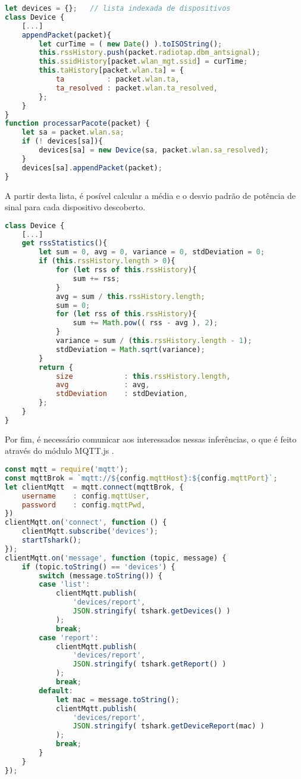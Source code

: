 \begin{lstlisting}[language=javascript,caption={Adição do pacote ao histórico do dispositivo},label=code-device-packet]
let devices = {};	// lista indexada de dispositivos
class Device {
	[...]
	appendPacket(packet){
		let curTime = ( new Date() ).toISOString();
		this.rssHistory.push(packet.radiotap.dbm_antsignal);
		this.ssidHistory[packet.wlan_mgt.ssid] = curTime;
		this.taHistory[packet.wlan.ta] = {
			ta			: packet.wlan.ta,
			ta_resolved	: packet.wlan.ta_resolved,
		};
	}
}
function processarPacote(packet) {
	let sa = packet.wlan.sa;
	if (! devices[sa]){
		devices[sa] = new Device(sa, packet.wlan.sa_resolved);
	}
	devices[sa].appendPacket(packet);
}
\end{lstlisting}

A partir desta lista, é posível calcular a média e o desvio padrão de potência de
sinal para cada dispositivo descoberto.

\begin{lstlisting}[language=javascript,caption={Extração das estatísticas do dispositivo},label=code-device-stats]
class Device {
	[...]
	get rssStatistics(){
		let sum = 0, avg = 0, variance = 0, stdDeviation = 0;
		if (this.rssHistory.length > 0){
			for (let rss of this.rssHistory){
				sum += rss;
			}
			avg = sum / this.rssHistory.length;
			sum = 0;
			for (let rss of this.rssHistory){
				sum += Math.pow(( rss - avg ), 2);
			}
			variance = sum / (this.rssHistory.length - 1);
			stdDeviation = Math.sqrt(variance);
		}
		return {
			size			: this.rssHistory.length,
			avg				: avg,
			stdDeviation	: stdDeviation,
		};
	}
}
\end{lstlisting}


Por fim, é necessário comunicar aos interessados nessas inferências, o que é
feito através do módulo MQTT.js \cite{mqttjs}.

\begin{lstlisting}[language=javascript,caption={Cliente MQTT.js},label=code-mqttjs-client]
const mqtt = require('mqtt');
const mqttBrok = `mqtt://${config.mqttHost}:${config.mqttPort}`;
let clientMqtt	= mqtt.connect(mqttBrok, {
	username	: config.mqttUser,
	password	: config.mqttPwd,
})
clientMqtt.on('connect', function () {
	clientMqtt.subscribe('devices');
	startTshark();
});
clientMqtt.on('message', function (topic, message) {
	if (topic.toString() == 'devices') {
		switch (message.toString()) {
		case 'list':
			clientMqtt.publish(
				'devices/report',
				JSON.stringify( tshark.getDevices() )
			);
			break;
		case 'report':
			clientMqtt.publish(
				'devices/report',
				JSON.stringify( tshark.getReport() )
			);
			break;
		default:
			let mac = message.toString();
			clientMqtt.publish(
				'devices/report',
				JSON.stringify( tshark.getDeviceReport(mac) )
			);
			break;
		}
	}
});
\end{lstlisting}

